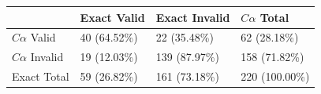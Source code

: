 \begin{tabular}{llll}
\toprule
 & Exact Valid & Exact Invalid & $C\alpha$ Total \\
\midrule
$C\alpha$ Valid & 40 (64.52\%) & 22 (35.48\%) & 62 (28.18\%) \\
$C\alpha$ Invalid & 19 (12.03\%) & 139 (87.97\%) & 158 (71.82\%) \\
Exact Total & 59 (26.82\%) & 161 (73.18\%) & 220 (100.00\%) \\
\bottomrule
\end{tabular}
